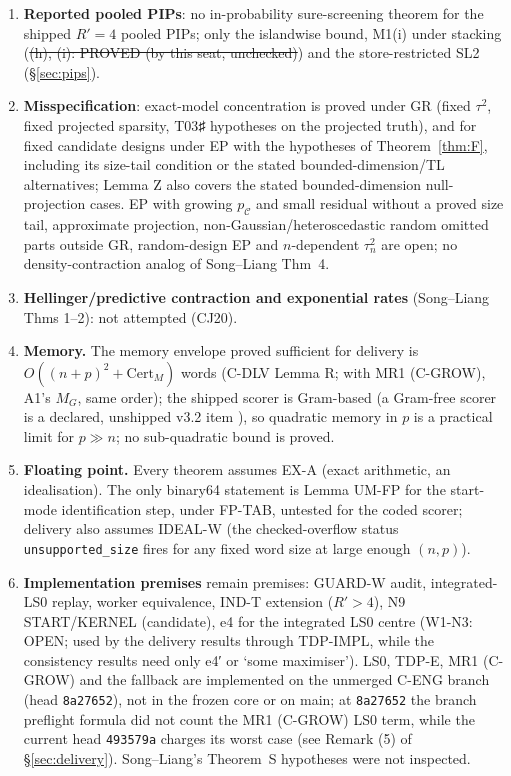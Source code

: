 \begin{notproved}
\begin{enumerate}
\item \textbf{Reported pooled PIPs}: no in-probability sure-screening theorem for the shipped $R'=4$ pooled PIPs; only the islandwise bound, M1(i) under stacking (\st{(h), (i): PROVED (by this seat, unchecked)}) and the store-restricted SL2 (§\ref{sec:pips}).
\item \textbf{Misspecification}: exact-model concentration is proved under GR (fixed $\tau^2$, fixed projected sparsity, T03♯ hypotheses on the projected truth), and for fixed candidate designs under EP with the hypotheses of Theorem~\ref{thm:F}, including its size-tail condition or the stated bounded-dimension/TL alternatives; Lemma Z also covers the stated bounded-dimension null-projection cases. EP with growing $p_{\mathcal C}$ and small residual without a proved size tail, approximate projection, non-Gaussian/heteroscedastic random omitted parts outside GR, random-design EP and $n$-dependent $\tau_n^2$ are open; no density-contraction analog of Song--Liang Thm~4.
\item \textbf{Hellinger/predictive contraction and exponential rates} (Song--Liang Thms 1--2): not attempted (CJ20).
\item \textbf{Memory.} The memory envelope proved sufficient for delivery is $O((n+p)^2+\mathrm{Cert}_M)$ words (C-DLV Lemma R; with MR1 (C-GROW), A1's $M_G$, same order); the shipped scorer is Gram-based (a Gram-free scorer is a declared, unshipped v3.2 item ), so quadratic memory in $p$ is a practical limit for $p\gg n$; no sub-quadratic bound is proved.
\item \textbf{Floating point.} Every theorem assumes EX-A (exact arithmetic, an idealisation). The only binary64 statement is Lemma UM-FP for the start-mode identification step, under FP-TAB, untested for the coded scorer; delivery also assumes IDEAL-W (the checked-overflow status \texttt{unsupported\_size} fires for any fixed word size at large enough $(n,p)$).
\item \textbf{Implementation premises} remain premises: GUARD-W audit, integrated-LS0 replay, worker equivalence, IND-T extension ($R'>4$), N9 START/KERNEL (candidate), e4 for the integrated LS0 centre (W1-N3: OPEN; used by the delivery results through TDP-IMPL, while the consistency results need only e4′ or `some maximiser'). LS0, TDP-E, MR1 (C-GROW) and the fallback are implemented on the unmerged C-ENG branch (head \texttt{8a27652}), not in the frozen core or on main; at \texttt{8a27652} the branch preflight formula did not count the MR1 (C-GROW) LS0 term, while the current head \texttt{493579a} charges its worst case (see Remark (5) of §\ref{sec:delivery}). Song--Liang's Theorem~S hypotheses were not inspected.
\end{enumerate}
\end{notproved}

